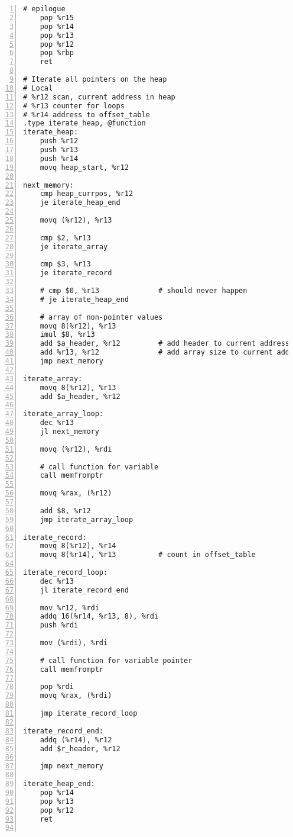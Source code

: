 \documentclass{article}
\begin{document}
\begin{lstlisting}[numbers=left, firstnumber=1]
    # epilogue
    pop %r15
    pop %r14
    pop %r13
    pop %r12
    pop %rbp
    ret 

# Iterate all pointers on the heap
# Local
# %r12 scan, current address in heap
# %r13 counter for loops
# %r14 address to offset_table
.type iterate_heap, @function
iterate_heap:
    push %r12
    push %r13
    push %r14
    movq heap_start, %r12
    
next_memory:
    cmp heap_currpos, %r12
    je iterate_heap_end
    
    movq (%r12), %r13
    
    cmp $2, %r13
    je iterate_array
    
    cmp $3, %r13
    je iterate_record
    
    # cmp $0, %r13              # should never happen
    # je iterate_heap_end
    
    # array of non-pointer values
    movq 8(%r12), %r13
    imul $8, %r13
    add $a_header, %r12         # add header to current address
    add %r13, %r12              # add array size to current address
    jmp next_memory
    
iterate_array:
    movq 8(%r12), %r13
    add $a_header, %r12    
   
iterate_array_loop:
    dec %r13
    jl next_memory
    
    movq (%r12), %rdi
    
    # call function for variable
    call memfromptr
    
    movq %rax, (%r12)
    
    add $8, %r12
    jmp iterate_array_loop

iterate_record:
    movq 8(%r12), %r14
    movq 8(%r14), %r13          # count in offset_table

iterate_record_loop:
    dec %r13
    jl iterate_record_end
    
    mov %r12, %rdi
    addq 16(%r14, %r13, 8), %rdi
    push %rdi
    
    mov (%rdi), %rdi
    
    # call function for variable pointer
    call memfromptr
    
    pop %rdi
    movq %rax, (%rdi)
    
    jmp iterate_record_loop
    
iterate_record_end:
    addq (%r14), %r12
    add $r_header, %r12
    
    jmp next_memory
    
iterate_heap_end:
    pop %r14
    pop %r13
    pop %r12
    ret


\end{lstlisting}
\end{document}
